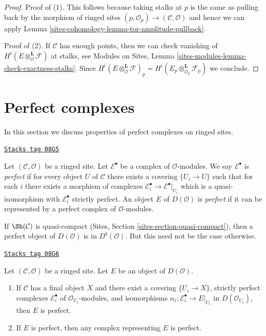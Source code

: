 \begin{proof}
Proof of (1). This follows because taking stalks at $p$ is
the same as pulling back by the morphism of ringed sites
$(p, \mathcal{O}_p) \to (\mathcal{C}, \mathcal{O})$ and hence
we can apply Lemma \ref{sites-cohomology-lemma-tor-amplitude-pullback}.

\medskip\noindent
Proof of (2). If $\mathcal{C}$ has enough points, then we can check
vanishing of
$H^i(E \otimes_\mathcal{O}^\mathbf{L} \mathcal{F})$
at stalks, see
Modules on Sites, Lemma \ref{sites-modules-lemma-check-exactness-stalks}.
Since $H^i(E \otimes_\mathcal{O}^\mathbf{L} \mathcal{F})_p =
H^i(E_p \otimes_{\mathcal{O}_p}^\mathbf{L} \mathcal{F}_p)$ we conclude.
\end{proof}

\section{Perfect complexes}
\label{sites-cohomology-section-perfect}
In this section we discuss properties of perfect complexes on
ringed sites.

\begin{definition}[Perfect]
\label{sites-cohomology-definition-perfect}
\href{https://stacks.math.columbia.edu/tag/08G5}{\texttt{Stacks tag 08G5}}

Let $(\mathcal{C}, \mathcal{O})$ be a ringed site.
Let $\mathcal{E}^\bullet$ be a complex of $\mathcal{O}$-modules.
We say $\mathcal{E}^\bullet$ is {\it perfect} if for every object $U$ of
$\mathcal{C}$ there exists a covering $\{U_i \to U\}$ such that for each $i$
there exists a morphism of complexes
$\mathcal{E}_i^\bullet \to \mathcal{E}^\bullet|_{U_i}$
which is a quasi-isomorphism with $\mathcal{E}_i^\bullet$
strictly perfect.
An object $E$ of $D(\mathcal{O})$ is {\it perfect}
if it can be represented by a perfect complex of $\mathcal{O}$-modules.
\end{definition}

If $\Sh(\mathcal{C})$ is quasi-compact
(Sites, Section \ref{sites-section-quasi-compact}),
then a perfect object of $D(\mathcal{O})$
is in $D^b(\mathcal{O})$. But this need not be the case otherwise.

\begin{lemma}
\label{sites-cohomology-lemma-perfect-independent-representative}
\href{https://stacks.math.columbia.edu/tag/08G6}{\texttt{Stacks tag 08G6}}

Let $(\mathcal{C}, \mathcal{O})$ be a ringed site.
Let $E$ be an object of $D(\mathcal{O})$.
\begin{enumerate}
\item If $\mathcal{C}$ has a final object $X$ and there exist a
covering $\{U_i \to X\}$, strictly perfect complexes $\mathcal{E}_i^\bullet$
of $\mathcal{O}_{U_i}$-modules, and isomorphisms
 $\alpha_i : \mathcal{E}_i^\bullet \to E|_{U_i}$ in
$D(\mathcal{O}_{U_i})$, then $E$ is perfect.
\item If $E$ is perfect, then any complex representing $E$ is perfect.
\end{enumerate}
\end{lemma}

